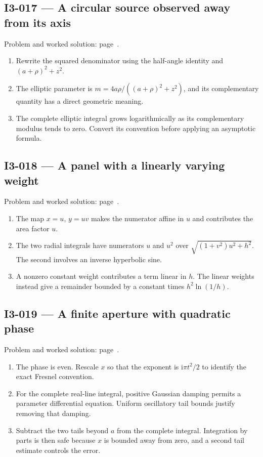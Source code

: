 \documentclass[11pt,oneside,openany]{book}
\begin{document}
\subsection*{I3-017 --- A circular source observed away from its axis}
\label{hints:I3-017}
Problem and worked solution: page~\pageref{problem:I3-017}.

\begin{enumerate}
\item Rewrite the squared denominator using the half-angle identity and \((a+\rho)^2+z^2\).
\item The elliptic parameter is \(m=4a\rho/((a+\rho)^2+z^2)\), and its complementary quantity has a direct geometric meaning.
\item The complete elliptic integral grows logarithmically as its complementary modulus tends to zero. Convert its convention before applying an asymptotic formula.
\end{enumerate}
\subsection*{I3-018 --- A panel with a linearly varying weight}
\label{hints:I3-018}
Problem and worked solution: page~\pageref{problem:I3-018}.

\begin{enumerate}
\item The map \(x=u\), \(y=uv\) makes the numerator affine in \(u\) and contributes the area factor \(u\).
\item The two radial integrals have numerators \(u\) and \(u^2\) over \(\sqrt{(1+v^2)u^2+h^2}\). The second involves an inverse hyperbolic sine.
\item A nonzero constant weight contributes a term linear in \(h\). The linear weights instead give a remainder bounded by a constant times \(h^2\ln(1/h)\).
\end{enumerate}
\subsection*{I3-019 --- A finite aperture with quadratic phase}
\label{hints:I3-019}
Problem and worked solution: page~\pageref{problem:I3-019}.

\begin{enumerate}
\item The phase is even. Rescale \(x\) so that the exponent is \(\mathrm{i}\pi t^2/2\) to identify the exact Fresnel convention.
\item For the complete real-line integral, positive Gaussian damping permits a parameter differential equation. Uniform oscillatory tail bounds justify removing that damping.
\item Subtract the two tails beyond \(a\) from the complete integral. Integration by parts is then safe because \(x\) is bounded away from zero, and a second tail estimate controls the error.
\end{enumerate}
\end{document}
